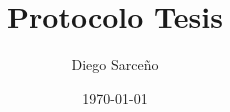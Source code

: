 



\title{Protocolo Tesis}
\author{Diego Sarceño}
\date{\today}

\pgfplotsset{compat=1.15}





\renewcommand{\labelenumii}{\arabic{enumi}.\arabic{enumii}}
\renewcommand{\labelenumiii}{\arabic{enumi}.\arabic{enumii}.\arabic{enumiii}}
\renewcommand{\labelenumiv}{\arabic{enumi}.\arabic{enumii}.\arabic{enumiii}.\arabic{enumiv}}

\begin{titlepage}

\end{titlepage}

\tableofcontents
\pagebreak





\pagebreak

\pagebreak

\pagebreak

\pagebreak

\pagebreak

\pagebreak
\vspace*{\fill}
\nocite{*}
%

\vspace*{\fill}
\pagebreak
%






